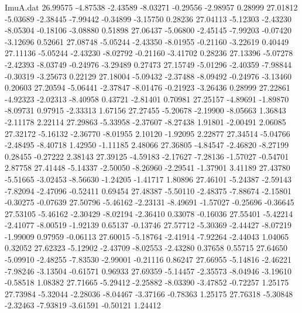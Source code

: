 \begin{filecontents}{ImuA.dat}
  26.99575   -4.87538   -2.43589   -8.03271   -0.29556   -2.98957    0.28999
  27.01812   -5.03689   -2.38445   -7.99442   -0.34899   -3.15750    0.28236
  27.04113   -5.12303   -2.43230   -8.05304   -0.18106   -3.08880    0.51898
  27.06437   -5.06800   -2.45145   -7.99203   -0.07420   -3.12696    0.52661
  27.08748   -5.05244   -2.43350   -8.01955   -0.21160   -3.22619    0.40449
  27.11136   -5.05244   -2.43230   -8.02792   -0.21160   -3.41702    0.28236
  27.13396   -5.07278   -2.42393   -8.03749   -0.24976   -3.29489    0.27473
  27.15749   -5.01296   -2.40359   -7.98844   -0.30319   -3.25673    0.22129
  27.18004   -5.09432   -2.37488   -8.09492   -0.24976   -3.13460    0.20603
  27.20594   -5.06441   -2.37847   -8.01476   -0.21923   -3.26436    0.28999
  27.22861   -4.92323   -2.02313   -8.40958    0.43721   -2.81401    0.70981
  27.25157   -4.89691   -1.89870   -8.09731    0.97915   -2.33313    1.67156
  27.27455   -5.20678   -2.19900   -8.05663    1.36843   -2.11178    2.22114
  27.29863   -5.33958   -2.37607   -8.27438    1.91801   -2.00491    2.06085
  27.32172   -5.16132   -2.36770   -8.01955    2.10120   -1.92095    2.22877
  27.34514   -5.04766   -2.48495   -8.40718    1.42950   -1.11185    2.48066
  27.36805   -4.84547   -2.46820   -8.27199    0.28455   -0.27222    2.38143
  27.39125   -4.59183   -2.17627   -7.28136   -1.57027   -0.54701    2.87758
  27.41448   -5.14337   -2.50050   -8.26960   -2.29541   -1.37901    3.41189
  27.43780   -5.51665   -3.02453   -8.56630   -1.24205   -1.41717    1.80896
  27.46101   -5.24387   -2.59143   -7.82094   -2.47096   -0.52411    0.69454
  27.48387   -5.50110   -2.48375   -7.88674   -2.15801   -0.30275   -0.07639
  27.50796   -5.46162   -2.23131   -8.49691   -1.57027   -0.25696   -0.36645
  27.53105   -5.46162   -2.30429   -8.02194   -2.36410    0.33078   -0.16036
  27.55401   -5.42214   -2.41077   -8.00519   -1.92139    0.65137   -0.13746
  27.57712   -5.30369   -2.44427   -8.07219   -1.99009    0.97959   -0.06113
  27.60015   -5.18764   -2.41914   -7.92264   -2.44043    1.04065    0.32052
  27.62323   -5.12902   -2.43709   -8.02553   -2.43280    0.37658    0.55715
  27.64650   -5.09910   -2.48255   -7.83530   -2.99001   -0.21116    0.86247
  27.66955   -5.14816   -2.46221   -7.98246   -3.13504   -0.61571    0.96933
  27.69359   -5.14457   -2.35573   -8.04946   -3.19610   -0.58518    1.08382
  27.71665   -5.29412   -2.25882   -8.03390   -3.47852   -0.72257    1.25175
  27.73984   -5.32044   -2.28036   -8.04467   -3.37166   -0.78363    1.25175
  27.76318   -5.30848   -2.32463   -7.93819   -3.61591   -0.50121    1.24412

\end{filecontents}

